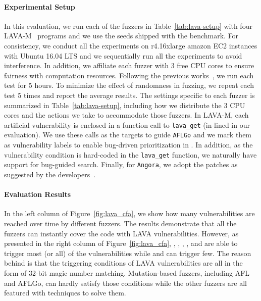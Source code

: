 \paragraph{Experimental Setup}
In this evaluation, we run each of the fuzzers in Table~\ref{tab:lava-setup} with four 
LAVA-M~\cite{lava} programs and we use the seeds shipped with the benchmark.  
For consistency, we conduct all the experiments on r4.16xlarge amazon EC2 instances 
with Ubuntu 16.04 LTS and we sequentially run all the experiments to avoid interference. 
In addition, we affiliate each fuzzer with 3 free CPU cores to ensure fairness with computation resources. 
Following the previous works~\cite{qsyminsu, angora,tfuzz}, we run each test for 5 hours.
To minimize the effect of randomness in fuzzing, we repeat each test 5 times and 
report the average results.
The settings specific to each fuzzer is summarized in Table~\ref{tab:lava-setup}, 
including how we distribute the 3 CPU cores and the actions we take to accommodate those fuzzers. 
In LAVA-M, each artificial vulnerability is enclosed in a function call to {\tt lava\_get} (in-lined in our evaluation).
We use these calls as the targets to guide {\tt AFLGo} and we mark them as vulnerability labels 
to enable bug-driven prioritization in \savior. In addition, as the vulnerability condition is 
hard-coded in the {\tt lava\_get} function, we naturally have support for bug-guided search.
Finally, for {\tt Angora}, we adopt the patches as suggested by the developers~\cite{tool-angora1}. 

\paragraph{Evaluation Results}In the left column of Figure~\ref{fig:lava_cfa}, 
we show how many vulnerabilities are reached over time by different fuzzers. The results demonstrate that all 
the fuzzers can instantly cover the code with LAVA vulnerabilities. However, as presented 
in the right column of Figure~\ref{fig:lava_cfa}, \tfuzz, \angora, \driller, \qsym, and \savior are able to 
trigger most (or all) of the vulnerabilities while \afl and \aflgo can trigger few. 
The reason behind is that the triggering conditions of LAVA vulnerabilities are all in the form of 
32-bit magic number matching. Mutation-based fuzzers, including AFL
and AFLGo, can hardly satisfy those conditions while the other fuzzers are all featured 
with techniques to solve them. 

